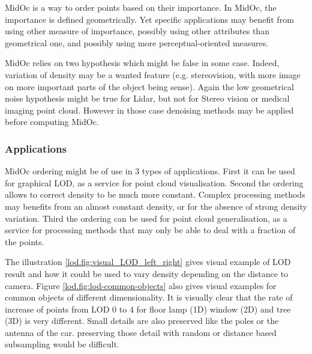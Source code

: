 		MidOc is a way to order points based on their importance. In MidOc,
		the importance is defined geometrically.
		Yet specific applications may benefit from using other measure of importance, 
		possibly using other attributes than geometrical one,
		and possibly using more perceptual-oriented measures.
		
		MidOc relies on two hypothesis which might be false in some case. 
		Indeed, variation of density may be a wanted feature
		(e.g. stereovision, with more image on more important parts of the object being sense).
		Again the low geometrical noise hypothesis might be true for Lidar, but not for Stereo vision 
		or medical imaging point cloud. However in those case denoising methods may be applied before computing MidOc.

	\subsubsection{Applications}
		MidOc ordering might be of use in 3 types of applications. First it can be used for graphical LOD, as a service for point cloud visualisation.
		Second the ordering allows to correct density to be much more constant.
		Complex processing methods may benefits from an almost constant density, or for the absence of strong density variation.
		Third the ordering can be used for point cloud generalisation,
		as a service for processing methods that may only be able to deal with a fraction of the points. 
		
		The illustration \ref{lod.fig:visual_LOD_left_right} gives visual example of LOD result and how it could be used to vary density depending on the distance to camera. 
		Figure \ref{lod.fig:lod-common-objects} also gives visual examples for common objects of different dimensionality.
		It is visually clear that the rate of increase of points from LOD 0 to 4 for floor lamp (1D) window (2D) and tree (3D) is very different.
		Small details are also preserved like the poles or the antenna of the car. preserving those detail with random or distance based subsampling would be difficult.
		
		 
